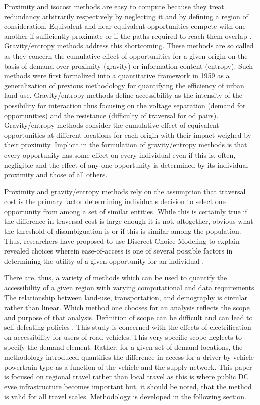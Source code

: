 \documentclass[11pt]{article}
\begin{document}
\begin{multicols}{2}
Proximity and isocost methods are easy to compute because they treat redundancy arbitrarily respectively by neglecting it and by defining a region of consideration. Equivalent and near-equivalent opportunities compete with one-another if sufficiently proximate or if the paths required to reach them overlap \cite{Stouffer_1940}. Gravity/entropy methods \cite{Noulas_2012, Jung_2008} address this shortcoming. These methods are so called as they concern the cumulative effect of opportunities for a given origin on the basis of demand over proximity (gravity) or information content (entropy). Such methods were first formalized into a quantitative framework in 1959 \cite{Hansen_1959} as a generalization of previous methodology for quantifying the efficiency of urban land use. Gravity/entropy methods define accessibility as the intensity of the possibility for interaction thus focusing on the voltage separation (demand for opportunities) and the resistance (difficulty of traversal for \gls{od} pairs). Gravity/entropy methods consider the cumulative effect of equivalent opportunities at different locations for each origin with their impact weighed by their proximity. Implicit in the formulation of gravity/entropy methods is that every opportunity has some effect on every individual even if this is, often, negligible and the effect of any one opportunity is determined by its individual proximity and those of all others.

Proximity and gravity/entropy methods rely on the assumption that traversal cost is the primary factor determining individuals decision to select one opportunity from among a set of similar entities. While this is certainly true if the difference in traversal cost is large enough it is not, altogether, obvious what the threshold of disambiguation is or if this is similar among the population. Thus, researchers have proposed to use Discreet Choice Modeling \cite{Ben_Akiva_1985} to explain revealed choices wherein ease-of-access is one of several possible factors in determining the utility of a given opportunity for an individual \cite{Cevero_1995, Shen_1998, Karst_2003}.

There are, thus, a variety of methods which can be used to quantify the accessibility of a given region with varying computational and data requirements. The relationship between land-use, transportation, and demography is circular rather than linear. Which method one chooses for an analysis reflects the scope and purpose of that analysis. Definition of scope can be difficult and can lead to self-defeating policies \cite{Handy_1996}. This study is concerned with the effects of electrification on accessibility for users of road vehicles. This very specific scope neglects to specify the demand element. Rather, for a given set of demand locations, the methodology introduced quantifies the difference in access for a driver by vehicle powertrain type as a function of the vehicle and the supply network. This paper is focused on regional travel rather than local travel as this is where public DC \gls{evse} infrastructure becomes important but, it should be noted, that the method is valid for all travel scales. Methodology is developed in the following section.


\end{multicols}
\end{document}
